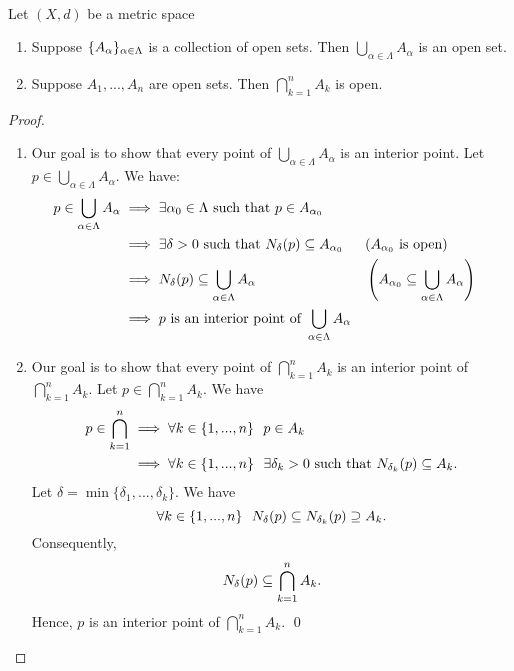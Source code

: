 \begin{theorem} \leavevmode \\
    \label{thm2.24}
    Let $(X,d)$ be a metric space
    \begin{enumerate}[$(i)$]
        \item Suppose $\{A_\alpha \}_{\alpha \in \Lambda}$ is a collection of open sets. Then $\bigcup \limits_{\alpha \in \Lambda}A_{\alpha}$ is an open set.
        \item Suppose $A_1, ..., A_n$ are open sets. Then $\bigcap \limits_{k=1}^n A_k$ is open.
    \end{enumerate}
\end{theorem}

\begin{proof}
    \begin{enumerate}[$(i)$]
        \item Our goal is to show that every point of $\bigcup \limits_{\alpha \in \Lambda} A_{\alpha}$ is an interior point. Let $p\in \bigcup \limits_{\alpha \in \Lambda}A_{\alpha}$. We have:
        \begin{align*}
            p\in \bigcup \limits_{\alpha \in \Lambda}A_{\alpha} &\implies \exists \alpha_0 \in \Lambda \text{ such that } p \in A_{\alpha_0} \\
            &\implies \exists \delta > 0 \text{ such that } N_{\delta}(p) \subseteq A_{\alpha_0} &&(A_{\alpha_0} \text{ is open}) \\
            &\implies N_{\delta}(p) \subseteq \bigcup \limits_{\alpha \in \Lambda}A_{\alpha} &&\left(A_{\alpha_0} \subseteq \bigcup \limits_{\alpha \in \Lambda}A_{\alpha}\right) \\
            &\implies p \text{ is an interior point of } \bigcup \limits_{\alpha \in \Lambda}A_{\alpha}
        \end{align*}
        
        \item Our goal is to show that every point of $\bigcap \limits_{k=1}^n A_k$ is an interior point of $\bigcap \limits_{k=1}^n A_k$. Let $p \in \bigcap \limits_{k=1}^n A_k.$ We have
        \begin{align*}
            p \in \bigcap \limits_{k=1}^n &\implies \forall k \in \{1,...,n\} ~~p \in A_k \\
            &\implies \forall k \in \{1,...,n\} ~~\exists \delta_k > 0 \text{ such that } N_{\delta_k}(p) \subseteq A_k.
        \end{align*}
        Let $\delta = \min \{\delta_1, ..., \delta_k\}.$ We have
        $$\forall k \in \{1,...,n\} ~~N_{\delta}(p) \subseteq N_{\delta_k}(p)\supseteq A_k.$$
        Consequently,
        $$N_{\delta}(p) \subseteq \bigcap \limits_{k=1}^n A_k.$$
        Hence, $p$ is an interior point of $\bigcap \limits_{k=1}^n A_k$.
        \qed
    \end{enumerate}
\end{proof}

